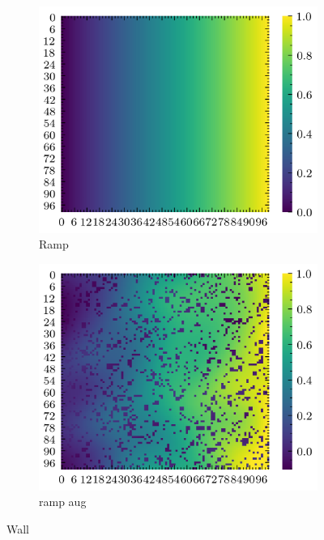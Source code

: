 \documentclass[../document.tex]{subfiles}
\begin{document}
\begin{figure}[H]
\begin{subfigure}[b]{0.45\textwidth}
            \includegraphics[width=\textwidth]{../img/data-aug/2d/ramp.png}
            \caption{Ramp}
        \end{subfigure}
        \begin{subfigure}[b]{0.45\linewidth}
            \includegraphics[width=\textwidth]{../img/data-aug/2d/ramp-aug.png}
            \caption{ramp aug}
        \end{subfigure}    
    \label{fig: others-aug}
    \caption{Wall}    
\end{figure}
\end{document}
